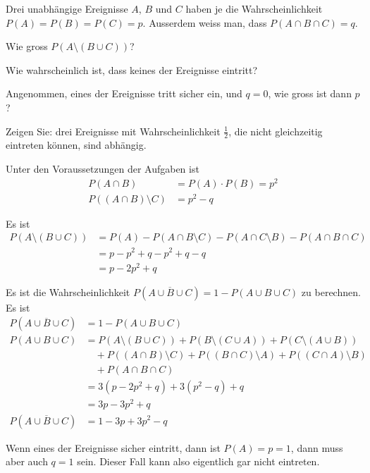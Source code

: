 Drei unabhängige Ereignisse $A$, $B$ und $C$ haben je die Wahrscheinlichkeit
$P(A)=P(B)=P(C)=p$. Ausserdem weiss man, dass $P(A\cap B\cap C)=q$.
\begin{teilaufgaben}
\item Wie gross $P(A\setminus(B\cup C))$?
\item Wie wahrscheinlich ist, dass keines der Ereignisse eintritt?
\item Angenommen, eines der Ereignisse tritt sicher ein, und $q=0$,
wie gross ist dann $p$?
\item Zeigen Sie: drei Ereignisse mit Wahrscheinlichkeit $\frac12$,
die nicht gleichzeitig eintreten können, sind abhängig.
\end{teilaufgaben}

\begin{loesung}
Unter den Voraussetzungen der Aufgaben ist
\begin{align*}
P(A\cap B)&=P(A)\cdot P(B) = p^2\\
P((A\cap B)\setminus C)&=p^2-q
\end{align*}
\begin{teilaufgaben}
\item Es ist
\begin{align*}
P(A\setminus (B\cup C))
&=
P(A) - P(A\cap B\setminus C) - P(A\cap C\setminus B)-P(A\cap B\cap C)
\\
&=p-p^2+q-p^2+q-q
\\
&=p-2p^2+q
\end{align*}
\item
Es ist die Wahrscheinlichkeit $P(\overline{A\cup B\cup C}) = 1-P(A\cup B\cup C)$ zu berechnen.
Es ist
\begin{align*}
P(\overline{A\cup B\cup C})
&=
1-P(A\cup B \cup C)\\
P(A\cup B \cup C)
&=
P(A\setminus(B\cup C))
+P(B\setminus(C\cup A))
+P(C\setminus(A\cup B))
\\
&\quad
+P((A\cap B)\setminus C)
+P((B\cap C)\setminus A)
+P((C\cap A)\setminus B)
\\
&\quad
+P(A\cap B\cap C)
\\
&=3(p-2p^2+q)+3(p^2-q)+q
\\
&=3p-3p^2+q
\\
P(\overline{A\cup B\cup C})
&=
1-3p+3p^2-q
\end{align*}
\item
Wenn eines der Ereignisse sicher eintritt, dann ist $P(A)=p=1$, dann muss
aber auch $q=1$ sein. Dieser Fall kann also eigentlich gar nicht
eintreten.


\end{teilaufgaben}
\end{loesung}
